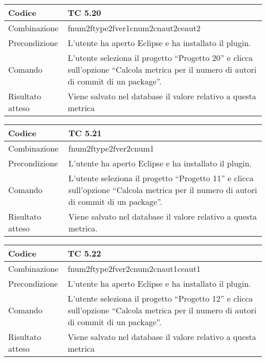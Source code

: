 \begin{table}[ht]
\begin{tabular}{|p{3cm}|p{9cm}|}
\hline
\cellcolor{lightgray}Codice				& TC 5.20								\\
\hline
\cellcolor{lightgray}Combinazione		& fnum2ftype2fver1cnum2cnaut2ceaut2 									\\
\hline
\cellcolor{lightgray}Precondizione		& L'utente ha aperto Eclipse e ha installato il plugin.									\\
\hline
\cellcolor{lightgray}Comando			& L'utente seleziona il progetto ``Progetto 20''  e clicca sull'opzione ``Calcola metrica per il numero di autori di commit di un package''.	\\
\hline
\cellcolor{lightgray}Risultato atteso	& Viene salvato nel database il valore relativo a questa metrica	\\
\hline
\end{tabular}
\end{table}

\begin{table}[ht]
\begin{tabular}{|p{3cm}|p{9cm}|}
\hline
\cellcolor{lightgray}Codice				& TC 5.21								\\
\hline
\cellcolor{lightgray}Combinazione		& fnum2ftype2fver2cnum1									\\
\hline
\cellcolor{lightgray}Precondizione		& L'utente ha aperto Eclipse e ha installato il plugin.		\\
\hline
\cellcolor{lightgray}Comando			& L'utente seleziona il progetto ``Progetto 11''  e clicca sull'opzione ``Calcola metrica per il numero di autori di commit di un package''.	\\
\hline
\cellcolor{lightgray}Risultato atteso	& Viene salvato nel database il valore relativo a questa metrica.\\
\hline
\end{tabular}
\end{table}

\begin{table}[ht]
\begin{tabular}{|p{3cm}|p{9cm}|}
\hline
\cellcolor{lightgray}Codice				& TC 5.22								\\
\hline
\cellcolor{lightgray}Combinazione		& fnum2ftype2fver2cnum2cnaut1ceaut1 									\\
\hline
\cellcolor{lightgray}Precondizione		& L'utente ha aperto Eclipse e ha installato il plugin.				\\
\hline
\cellcolor{lightgray}Comando			& L'utente seleziona il progetto ``Progetto 12''  e clicca sull'opzione ``Calcola metrica per il numero di autori di commit di un package''.	\\
\hline
\cellcolor{lightgray}Risultato atteso	& Viene salvato nel database il valore relativo a questa metrica	\\
\hline
\end{tabular}
\end{table}

